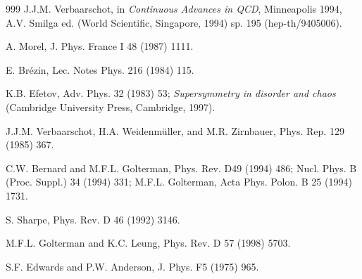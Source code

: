 \begin{thebibliography}{999}
       J.J.M. Verbaarschot, 
                      in {\it Continuous Advances in QCD}, 
                      Minneapolis 1994, A.V. Smilga ed. 
                      (World Scientific, Singapore, 1994) sp. 195 
                      (hep-th/9405006).                             %

       A. Morel, 
                      J. Phys. France I 48 (1987) 1111.           %

      E. Br\'ezin, 
                      Lec. Notes Phys. 216 (1984) 115.        %

      K.B. Efetov, 
                      Adv. Phys. 32 (1983) 53;                %
                      {\it Supersymmetry in disorder and chaos}
                      (Cambridge University Press, Cambridge, 1997).  %

         J.J.M. Verbaarschot, H.A. Weidenm\"uller, and
                      M.R. Zirnbauer, 
                      Phys. Rep. 129 (1985) 367.               %

     C.W. Bernard and M.F.L. Golterman, 
                      Phys. Rev. D49 (1994) 486;                   %
                      Nucl. Phys. B (Proc. Suppl.) 34 (1994) 331;   %
                      M.F.L. Golterman, 
                      Acta Phys. Polon. B 25 (1994) 1731.     %

      S. Sharpe, 
                      Phys. Rev. D 46 (1992) 3146.

       M.F.L. Golterman and K.C. Leung,  
                      Phys. Rev. D 57 (1998) 5703.            %


     S.F. Edwards and P.W. Anderson, 
                      J. Phys. F5 (1975) 965.                 %


\end{thebibliography}
